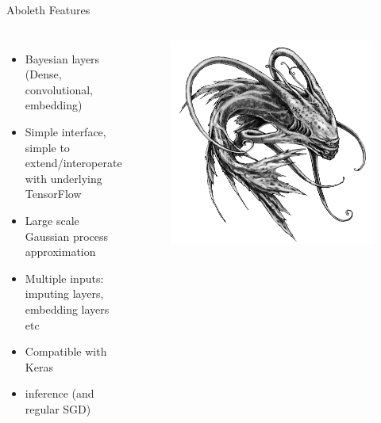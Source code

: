\documentclass[lualatex, aspectratio=169]{beamer}
\begin{document}
\begin{frame}{Aboleth Features}
  \begin{columns}
    \column{0.6\pagewidth}
    \begin{itemize}
      \item Bayesian layers (Dense, convolutional, embedding)
      \item Simple interface, simple to extend/interoperate with underlying TensorFlow
      \item Large scale Gaussian process approximation
      \item Multiple inputs: imputing layers, embedding layers etc
      \item Compatible with Keras
      \item {} inference (and regular SGD)
    \end{itemize}
    \column{0.3\pagewidth}
    \begin{figure}
      \includegraphics[width=0.3\pagewidth]{assets/aboleth.jpg}
    \end{figure}
  \end{columns}
\end{frame}
\end{document}
